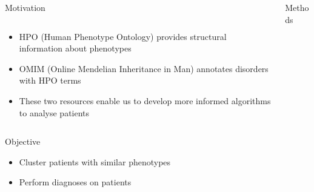 \documentclass[final]{beamer} %
\begin{document}
\begin{frame}{}
\begin{columns}[T]
\begin{column}{0.3\linewidth}
\begin{block}{\Huge Motivation}
\begin{columns}[T]
      \begin{column}{.5\textwidth}
	    \Large
        \begin{itemize}
          \item
          HPO (Human Phenotype Ontology) provides structural information about phenotypes
          \item
          OMIM (Online Mendelian Inheritance in Man) annotates disorders with HPO terms
          \item 
          These two resources enable us to develop more informed algorithms to analyse patients
      \end{itemize}  
      \vspace{5cm}
      \end{column}
    \end{columns}

    \end{block}
    \begin{block}{\Huge Objective}
     \begin{itemize}
    \Large
     \item
     Cluster patients with similar phenotypes
    \item
    Perform diagnoses on patients
     \end{itemize}
      \end{block}
    \end{column}

    \begin{column}{0.3\linewidth}
    \begin{block}{\Huge Methods}


\end{block}
\end{column}
\end{columns}
\end{frame}
\end{document}
